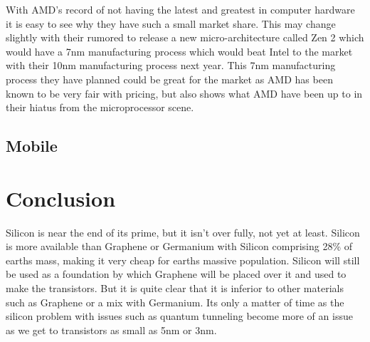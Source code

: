 \documentclass[journal]{IEEEtran}
\begin{document}
With AMD's record of not having the latest and greatest in computer hardware it is easy to see why they have such a small market share. This may change slightly with their rumored to release a new micro-architecture called Zen 2 which would have a 7nm manufacturing process which would beat Intel to the market with their 10nm manufacturing process next year. This 7nm manufacturing process they have planned could be great for the market as AMD has been known to be very fair with pricing, but also shows what AMD have been up to in their hiatus from the microprocessor scene.

\subsection{Mobile}


\section{Conclusion}
Silicon is near the end of its prime, but it isn't over fully, not yet at least. Silicon is more available than Graphene or Germanium with Silicon comprising 28\% of earths mass, making it very cheap for earths massive population. Silicon will still be used as a foundation by which Graphene will be placed over it and used to make the transistors. But it is quite clear that it is inferior to other materials such as Graphene or a mix with Germanium. Its only a matter of time as the silicon problem with issues such as quantum tunneling become more of an issue as we get to transistors as small as 5nm or 3nm.

\printbibliography
\end{document}
